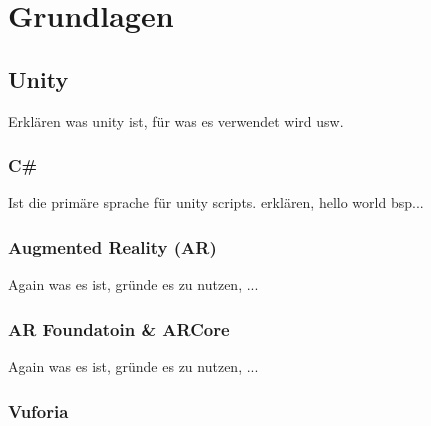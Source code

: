 \setlength{\parindent}{0em}


\chapter{Grundlagen} %

\label{Kapitel 2} %


\section{Unity}

Erklären was unity ist, für was es verwendet wird usw.

\subsection{C\#}

Ist die primäre sprache für unity scripts. erklären, hello world bsp...


\subsection{Augmented Reality (AR)}

Again was es ist, gründe es zu nutzen, ...


\subsection{AR Foundatoin \& ARCore}

Again was es ist, gründe es zu nutzen, ...


\subsection{Vuforia}

